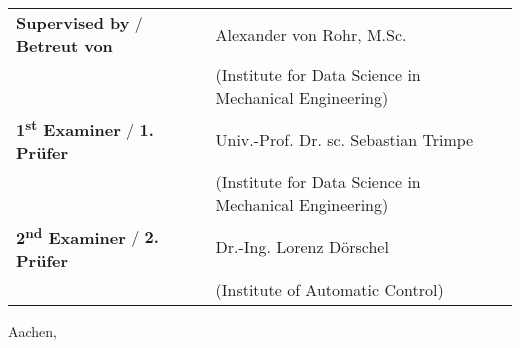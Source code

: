 \begin{titlepage}
\begin{adjustwidth}{-1.8cm}{-1.8cm}
    \begin{flushleft}
    \hspace{-0.1cm}\noindent\begin{tabular}{ll}
        \textbf{Supervised by} / \textcolor{black!60}{\textbf{Betreut von}} & Alexander von Rohr, M.Sc. \\
        &  (Institute for Data Science in Mechanical Engineering) \vspace{0.4cm}\\
        \textbf{1\textsuperscript{st} Examiner} / \textcolor{black!60}{\textbf{1. Prüfer}} & Univ.-Prof. Dr. sc. Sebastian Trimpe \\
        & (Institute for Data Science in Mechanical Engineering) \vspace{0.2cm}\\
        \textbf{2\textsuperscript{nd} Examiner} / \textcolor{black!60}{\textbf{2. Prüfer}} & Dr.-Ing. Lorenz Dörschel \\
        & (Institute of Automatic Control)
    \end{tabular}
    \end{flushleft}
    
    \vfill
    \vspace{2cm}\hfill Aachen, \submitdate

    \end{adjustwidth}
\end{titlepage}

